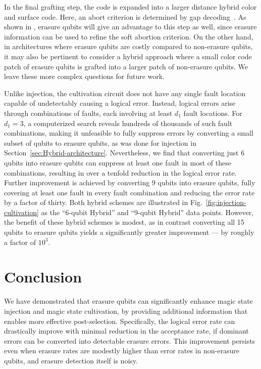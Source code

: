 \documentclass[twocolumn,
notitlepage,
aps,
prx,
floatfix,
superscriptaddress
]{revtex4-2}
\begin{document}
In the final grafting step, the code is expanded into a larger distance hybrid color and surface code. Here, an abort criterion is determined by gap decoding~\cite{gidney2024magic}. 
As shown in \cite{vaknin2025cultivation}, erasure qubits will give an advantage to this step as well, since erasure information can be used to refine the soft abortion criterion. 
On the other hand, in architectures where erasure qubits are costly compared to non-erasure qubits, it may also be pertinent to consider a hybrid approach where a small color code patch of erasure qubits is grafted into a larger patch of non-erasure qubits.
We leave these more complex questions for future work.

Unlike injection, the cultivation circuit does not have any single fault location capable of undetectably causing a logical error.
Instead, logical errors arise through combinations of faults, each involving at least $d_1$ fault locations.
For $d_1=3$, a computerized search reveals hundreds of thousands of such fault combinations, making it unfeasible to fully suppress errors by converting a small subset of qubits to erasure qubits, as was done for injection in Section~\ref{sec:Hybrid-architecture}.
Nevertheless, we find that converting just 6 qubits into erasure qubits can suppress at least one fault in most of these combinations, resulting in over a tenfold reduction in the logical error rate. 
Further improvement is achieved by converting 9 qubits into erasure qubits, fully covering at least one fault in every fault combination and reducing the error rate by a factor of thirty.
Both hybrid schemes are illustrated in Fig.~\ref{fig:injection-cultivation} as the ``6-qubit Hybrid'' and ``9-qubit Hybrid'' data points.
However, the benefit of these hybrid schemes is modest, as in contrast converting all 15 qubits to erasure qubits yields a significantly greater improvement --- by roughly a factor of $10^3$.


\section{Conclusion}

We have demonstrated that erasure qubits can significantly enhance magic state injection and magic state cultivation, by providing additional information that enables more effective post-selection. 
Specifically, the logical error rate can drastically improve with minimal reduction in the acceptance rate, if dominant errors can be converted into detectable erasure errors.
This improvement persists even when erasure rates are modestly higher than error rates in non-erasure qubits, and erasure detection itself is noisy.
\end{document}

